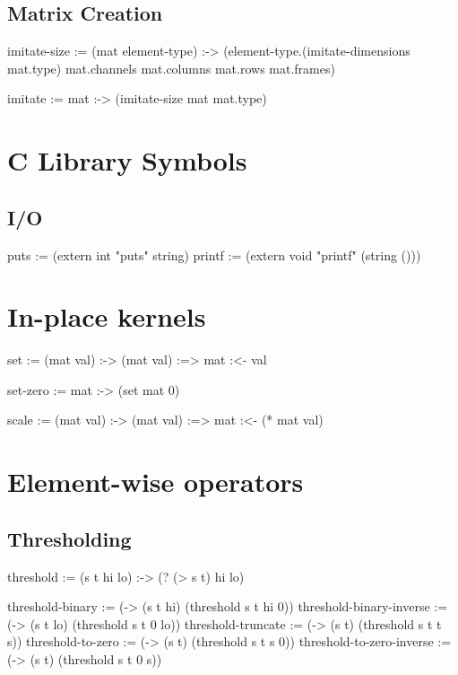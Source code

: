 \documentclass[twoside=false, numbers=noenddot]{scrbook}
\newenvironment{likely}
{ \verbatim }
{ \endverbatim }
\begin{document}
\section{Matrix Creation}
\begin{likely}
imitate-size :=
  (mat element-type) :->
    (element-type.(imitate-dimensions mat.type) mat.channels mat.columns mat.rows mat.frames)

imitate :=
  mat :->
    (imitate-size mat mat.type)
\end{likely}

\chapter{C Library Symbols}
\section{I/O}
\begin{likely}
puts := (extern int "puts" string)
printf := (extern void "printf" (string ()))
\end{likely}

\chapter{In-place kernels}
\begin{likely}
set :=
  (mat val) :->
    (mat val) :=>
      mat :<- val

set-zero :=
  mat :->
    (set mat 0)

scale :=
  (mat val) :->
    (mat val) :=>
      mat :<- (* mat val)
\end{likely}

\chapter{Element-wise operators}
\section{Thresholding}
\begin{likely}
threshold :=
  (s t hi lo) :->
    (? (> s t) hi lo)

threshold-binary          := (-> (s t hi) (threshold s t hi 0))
threshold-binary-inverse  := (-> (s t lo) (threshold s t 0  lo))
threshold-truncate        := (-> (s t)    (threshold s t t  s))
threshold-to-zero         := (-> (s t)    (threshold s t s  0))
threshold-to-zero-inverse := (-> (s t)    (threshold s t 0  s))
\end{likely}
\end{document}
